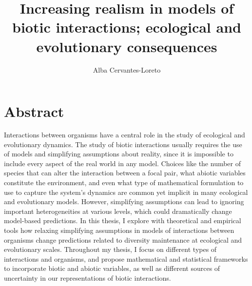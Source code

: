 \documentclass[12pt]{article}
\title{Increasing realism in models of biotic interactions; ecological and evolutionary consequences}
\author[1]{Alba Cervantes-Loreto}
\date{}
\begin{document}
\linenumbers
\baselineskip30pt
\maketitle

\section*{Abstract}
Interactions between organisms have a central role in the study of ecological and evolutionary dynamics. The study of biotic interactions usually requires the use of models and simplifying assumptions about reality, since it is impossible to include every aspect of the real world in any model.  Choices like the number of species that can alter the interaction between a focal pair, what abiotic variables constitute the environment, and even what type of mathematical formulation to use to capture the system's dynamics are common yet implicit in many ecological and evolutionary models. However, simplifying assumptions can lead to ignoring important heterogeneities at various levels, which could dramatically change model-based predictions. In this thesis, I explore with theoretical and empirical tools how relaxing simplifying assumptions in models of interactions between organisms change predictions related to diversity maintenance at ecological and evolutionary scales. Throughout my thesis, I focus on different types of interactions and organisms, and propose mathematical and statistical frameworks to incorporate biotic and abiotic variables, as well as different sources of uncertainty in our representations of biotic interactions.
\end{document}
